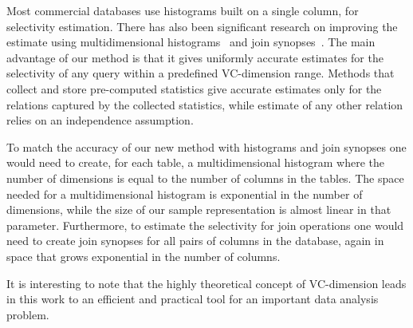 Most commercial databases use histograms built on a single column, for selectivity
estimation. There has also been significant research on improving the estimate
using multidimensional
histograms~\citep{BrunoCG01,PoosalaI97,SrivastavaHMKT,WangS03} and join
synopses~\citep{AcharyaGPR99}. The main advantage of our method is that it gives
uniformly accurate estimates for the selectivity of any query within a predefined
VC-dimension range. Methods that collect and store pre-computed statistics give
accurate estimates only for the relations captured by the collected statistics,
while estimate of any other relation relies on an independence assumption.

To match the accuracy of our new method with histograms and join synopses
one would need to create, for each table, a multidimensional histogram where the
number of dimensions is equal to the number of columns in the tables. The space
needed for a multidimensional histogram is exponential in the number of
dimensions, while the size of our sample representation is almost linear in that parameter. 
Furthermore, to estimate the selectivity for join operations
one would need to create join synopses for all pairs of columns in the database,
again in space that grows exponential in the number of columns.

It is interesting to note that the highly theoretical concept of VC-dimension
leads in this work to an efficient and practical tool for an important data
analysis problem.

